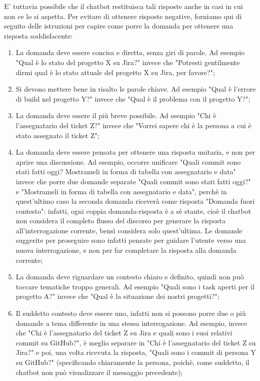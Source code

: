 E' tuttavia possibile che il chatbot restituisca tali risposte anche in casi in cui non ce lo si aspetta.
Per evitare di ottenere risposte negative, forniamo qui di seguito delle istruzioni per capire come porre la domanda per
ottenere una risposta soddisfacente:
\begin{enumerate}
    \item La domanda deve essere concisa e diretta, senza giri di parole. Ad esempio "Qual è lo stato del progetto X su Jira?" invece
    che "Potresti gentilmente dirmi qual è lo stato attuale del progetto X su Jira, per favore?";
    \item Si devono mettere bene in risalto le parole chiave. Ad esempio "Qual è l'errore di build nel progetto Y?" invece che "Qual
    è il problema con il progetto Y?";
    \item La domanda deve essere il più breve possibile. Ad esempio "Chi è l'assegnatario del ticket Z?" invece che "Vorrei sapere
    chi è la persona a cui è stato assegnato il ticket Z";
    \item La domanda deve essere pensata per ottenere una risposta unitaria, e non per aprire una discussione. Ad esempio, occorre
    unificare "Quali commit sono stati fatti oggi? Mostrameli in forma di tabella con assegnatario e data" invece che porre due domande
    separate "Quali commit sono stati fatti oggi?" e "Mostrameli in forma di tabella con assegnatario e data", perchè in quest'ultimo
    caso la seconda domanda riceverà come risposta "Domanda fuori contesto": infatti, ogni coppia domanda-risposta è a sè stante, cioè
    il chatbot non considera il completo flusso del discorso per generare la risposta all'interrogazione corrente, bensì considera solo
    quest'ultima. Le domande suggerite per proseguire sono infatti pensate per guidare l'utente verso una nuova interrogazione, e non per far
    completare la risposta alla domanda corrente;
    \item La domanda deve riguardare un contesto chiaro e definito, quindi non può toccare tematiche troppo generali. Ad esempio
    "Quali sono i task aperti per il progetto A?" invece che "Qual è la situazione dei nostri progetti?";
    \item Il suddetto contesto deve essere uno, infatti non si possono porre due o più domande a tema differente in una stessa
    interrogazione. Ad esempio, invece che "Chi è l'assegnatario del ticket Z su Jira
    e quali sono i suoi relativi commit su GitHub?", è meglio separare in "Chi è l'assegnatario del ticket Z su Jira?" e poi, una 
    volta ricevuta la risposta, "Quali sono i commit di persona Y su GitHub?" (specificando chiaramente la persona, poichè, come suddetto, il chatbot non può visualizzare il messaggio precedente);

\end{enumerate}
